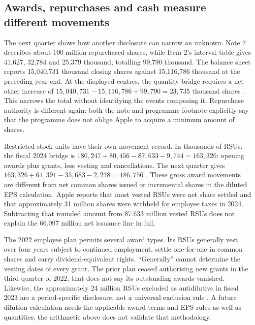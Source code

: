 \subsection{Awards, repurchases and cash measure different movements}

The next quarter shows how another disclosure can narrow an unknown. Note 7
describes about 100 million repurchased shares, while Item 2's interval table
gives 41,627, 32,784 and 25,379 thousand, totalling 99,790 thousand. The balance
sheet reports 15,040,731 thousand closing shares against 15,116,786 thousand
at the preceding year end. At the displayed centres, the quantity bridge requires a net
other increase of $15{,}040{,}731-15{,}116{,}786+99{,}790=23{,}735$ thousand
shares \citep[printed pp.~3, 10 and 20]{apple2025q1}. This narrows the total
without identifying the events composing it. Repurchase authority is different
again: both the note and programme footnote explicitly say that the programme
does not oblige Apple to acquire a minimum amount of shares.

Restricted stock units have their own movement record. In thousands of RSUs,
the fiscal 2024 bridge is $180{,}247+80{,}456-87{,}633-9{,}744=163{,}326$:
opening awards plus grants, less vesting and cancellations. The next quarter
gives $163{,}326+61{,}391-35{,}683-2{,}278=186{,}756$
\citep[Note 11, printed pp.~44--45]{apple2024}
\citep[Note 8, printed p.~10]{apple2025q1}. These gross award movements are
different from net common shares issued or incremental shares in the diluted
EPS calculation. Apple reports that most vested RSUs were net share settled
and that approximately 31 million shares were withheld for employee taxes in
2024. Subtracting that rounded amount from 87.633 million vested RSUs does
not explain the 66.097 million net issuance line in full.

The 2022 employee plan permits several award types. Its RSUs generally vest
over four years subject to continued employment, settle one-for-one in common
shares and carry dividend-equivalent rights. ``Generally'' cannot determine
the vesting dates of every grant. The prior plan ceased authorising new grants
in the third quarter of 2022; that does not say its outstanding awards vanished.
Likewise, the approximately 24 million RSUs excluded as antidilutive in fiscal
2023 are a period-specific disclosure, not a universal exclusion rule
\citep[Notes 3 and 11, printed pp.~36 and 44--45]{apple2024}. A future dilution
calculation needs the applicable award terms and EPS rules as well as quantities;
the arithmetic above does not validate that methodology.

